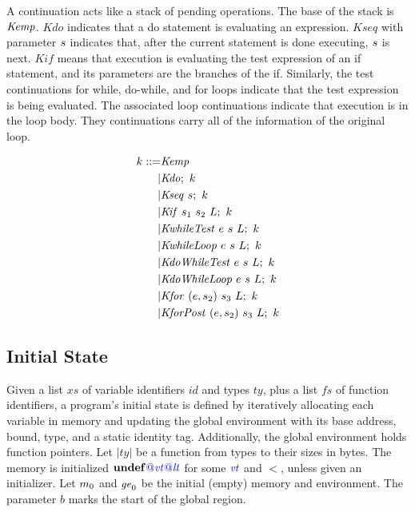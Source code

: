 \documentclass{llncs}
\begin{document}
A continuation acts like a stack of pending operations. The base of the stack is
\(\mathit{Kemp}\). \(\mathit{Kdo}\) indicates that a do statement is evaluating an expression.
\(\mathit{Kseq}\) with parameter \(s\) indicates that, after the current statement
is done executing, \(s\) is next. \(\mathit{Kif}\) means that execution is evaluating
the test expression of an if statement, and its parameters are the branches of the
if. Similarly, the test continuations for while, do-while, and for loops indicate that
the test expression is being evaluated. The associated loop continuations indicate that
execution is in the loop body. They continuations carry all of the information of the original
loop.

\[\begin{split}
k ::= & \mathit{Kemp} \\
| & \mathit{Kdo};~ k \\
| & \mathit{Kseq} ~ s; ~ k \\
| & \mathit{Kif} ~ s_1 ~ s_2 ~ L; ~ k \\
| & \mathit{KwhileTest} ~ e ~ s ~ L; ~ k \\
| & \mathit{KwhileLoop} ~ e ~ s ~ L; ~ k \\
| & \mathit{KdoWhileTest} ~ e ~ s ~ L; ~ k \\
| & \mathit{KdoWhileLoop} ~ e ~ s ~ L; ~ k \\
| & \mathit{Kfor} ~ (e,s_2) ~ s_3 ~ L ; ~ k \\
| & \mathit{KforPost} ~ (e,s_2) ~ s_3 ~ L ; ~ k \\
\end{split}\]

\subsection{Initial State}

Given a list \(xs\) of variable identifiers \(id\) and types
\(ty\), plus a list \(fs\) of function identifiers,
a program's initial state is defined by iteratively allocating each variable
in memory and updating the global environment with its base address, bound, type,
and a static identity tag. Additionally, the global environment holds function
pointers.
Let \(|ty|\) be a function from types to their sizes
in bytes. The memory is initialized \(\mathbf{undef}{\color{blue} @}\mathit{\color{blue} vt}{\color{blue} @}\mathit{\color{blue} lt}\)
for some \(\mathit{\color{blue} vt}\) and \(\lt\), unless given an initializer.
Let \(m_0\) and \(\mathit{ge}_0\) be the initial (empty) memory and environment.
The parameter \(b\) marks the start of the global region.
\end{document}
